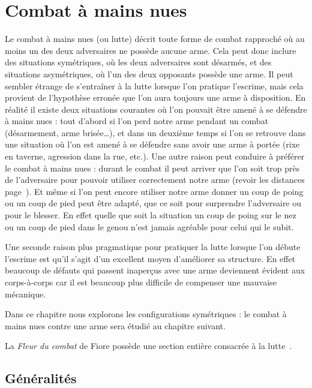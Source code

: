 \chapter{Combat à mains nues}


Le combat à mains nues (ou lutte) décrit toute forme de combat rapproché où au moins un des deux adversaires ne possède aucune arme.
Cela peut donc inclure des situations symétriques, où les deux adversaires sont désarmés, et des situations asymétriques, où l'un des deux opposants possède une arme.
Il peut sembler étrange de s'entraîner à la lutte lorsque l'on pratique l'escrime, mais cela provient de l'hypothèse erronée que l'on aura toujours une arme à disposition.
En réalité il existe deux situations courantes où l'on pouvait être amené à se défendre à mains nues : tout d'abord si l'on perd notre arme pendant un combat (désarmement, arme brisée…), et dans un deuxième temps si l'on se retrouve dans une situation où l'on est amené à se défendre sans avoir une arme à portée (rixe en taverne, agression dans la rue, etc.).
Une autre raison peut conduire à préférer le combat à mains nues : durant le combat il peut arriver que l'on soit trop près de l'adversaire pour pouvoir utiliser correctement notre arme (revoir les distances page~\pageref{conc:def:distances}).
Et même si l'on peut encore utiliser notre arme donner un coup de poing ou un coup de pied peut être adapté, que ce soit pour surprendre l'adversaire ou pour le blesser.
En effet quelle que soit la situation un coup de poing sur le nez ou un coup de pied dans le genou n'est jamais agréable pour celui qui le subit.

Une seconde raison plus pragmatique pour pratiquer la lutte lorsque l'on débute l'escrime est qu'il s'agit d'un excellent moyen d'améliorer sa structure.
En effet beaucoup de défauts qui passent inaperçus avec une arme deviennent évident aux corps-à-corps car il est beaucoup plus difficile de compenser une mauvaise mécanique.

Dans ce chapitre nous explorons les configurations symétriques : le combat à mains nues contre une arme sera étudié au chapitre suivant.

La \emph{Fleur du combat} de Fiore possède une section entière consacrée à la lutte~\cite{deiLiberi:Conan:2013:FleurCombat:Lutte}.


\section{Généralités}


